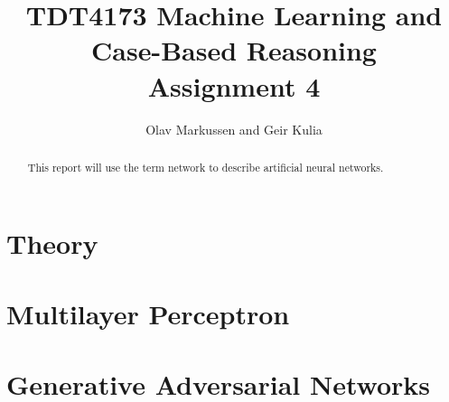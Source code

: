 \documentclass{article}
\begin{document}
\title{TDT4173 Machine Learning and Case-Based Reasoning \\ Assignment 4}

\author{Olav Markussen and Geir Kulia}

\maketitle

\begin{abstract}
This report will use the term network to describe artificial neural networks. 
\end{abstract}

\section{Theory}
	\label{sec:theory}
	

\section{Multilayer Perceptron}
	\label{sec:mlp}
	

\section{Generative Adversarial Networks}
	\label{sec:wgan}
	

{}

\end{document}
